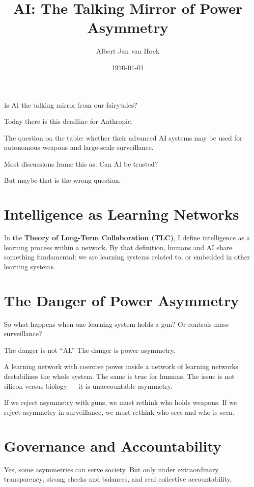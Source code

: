 \documentclass{article}
\title{AI: The Talking Mirror of Power Asymmetry}
\author{Albert Jan van Hoek}
\date{\today}
\begin{document}
\maketitle

Is AI the talking mirror from our fairytales?

Today there is this deadline for Anthropic.

The question on the table: whether their advanced AI systems may be used for autonomous weapons and large-scale surveillance.

Most discussions frame this as: Can AI be trusted?

But maybe that is the wrong question.

\section*{Intelligence as Learning Networks}

In the \textbf{Theory of Long-Term Collaboration (TLC)}, I define intelligence as a learning process within a network. By that definition, humans and AI share something fundamental: we are learning systems related to, or embedded in other learning systems.

\section*{The Danger of Power Asymmetry}

So what happens when one learning system holds a gun?
Or controls mass surveillance?

The danger is not ``AI.''
The danger is power asymmetry.

A learning network with coercive power inside a network of learning networks destabilizes the whole system. The same is true for humans. The issue is not silicon versus biology — it is unaccountable asymmetry.

If we reject asymmetry with guns, we must rethink who holds weapons.
If we reject asymmetry in surveillance, we must rethink who sees and who is seen.

\section*{Governance and Accountability}

Yes, some asymmetries can serve society. But only under extraordinary transparency, strong checks and balances, and real collective accountability.
\end{document}
